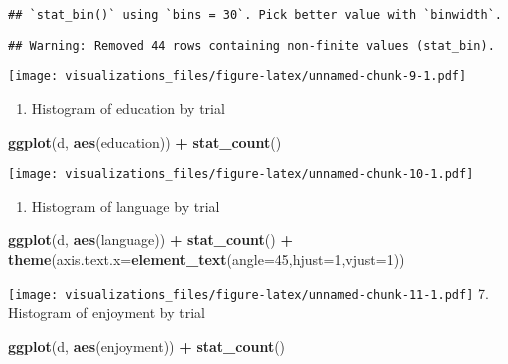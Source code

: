 \documentclass[]{article}
\newenvironment{Shaded}{\begin{snugshade}}{\end{snugshade}}
\newcommand{\KeywordTok}[1]{\textcolor[rgb]{0.13,0.29,0.53}{\textbf{#1}}}
\newcommand{\DataTypeTok}[1]{\textcolor[rgb]{0.13,0.29,0.53}{#1}}
\newcommand{\DecValTok}[1]{\textcolor[rgb]{0.00,0.00,0.81}{#1}}
\newcommand{\StringTok}[1]{\textcolor[rgb]{0.31,0.60,0.02}{#1}}
\newcommand{\OperatorTok}[1]{\textcolor[rgb]{0.81,0.36,0.00}{\textbf{#1}}}
\newcommand{\NormalTok}[1]{#1}
\providecommand{\tightlist}{%
  \setlength{\itemsep}{0pt}\setlength{\parskip}{0pt}}
\begin{document}
\begin{verbatim}
## `stat_bin()` using `bins = 30`. Pick better value with `binwidth`.
\end{verbatim}

\begin{verbatim}
## Warning: Removed 44 rows containing non-finite values (stat_bin).
\end{verbatim}

\texttt{[image: visualizations\_files/figure-latex/unnamed-chunk-9-1.pdf]}

\begin{enumerate}
\def\labelenumi{\arabic{enumi}.}
\setcounter{enumi}{4}
\tightlist
\item
  Histogram of education by trial
\end{enumerate}

\begin{Shaded}
\begin{Highlighting}[]
\KeywordTok{ggplot}\NormalTok{(d, }\KeywordTok{aes}\NormalTok{(education)) }\OperatorTok{+}
\StringTok{   }\KeywordTok{stat_count}\NormalTok{()}
\end{Highlighting}
\end{Shaded}

\texttt{[image: visualizations\_files/figure-latex/unnamed-chunk-10-1.pdf]}

\begin{enumerate}
\def\labelenumi{\arabic{enumi}.}
\setcounter{enumi}{5}
\tightlist
\item
  Histogram of language by trial
\end{enumerate}

\begin{Shaded}
\begin{Highlighting}[]
\KeywordTok{ggplot}\NormalTok{(d, }\KeywordTok{aes}\NormalTok{(language)) }\OperatorTok{+}
\StringTok{   }\KeywordTok{stat_count}\NormalTok{() }\OperatorTok{+}
\StringTok{   }\KeywordTok{theme}\NormalTok{(}\DataTypeTok{axis.text.x=}\KeywordTok{element_text}\NormalTok{(}\DataTypeTok{angle=}\DecValTok{45}\NormalTok{,}\DataTypeTok{hjust=}\DecValTok{1}\NormalTok{,}\DataTypeTok{vjust=}\DecValTok{1}\NormalTok{))}
\end{Highlighting}
\end{Shaded}

\texttt{[image: visualizations\_files/figure-latex/unnamed-chunk-11-1.pdf]}
7. Histogram of enjoyment by trial

\begin{Shaded}
\begin{Highlighting}[]
\KeywordTok{ggplot}\NormalTok{(d, }\KeywordTok{aes}\NormalTok{(enjoyment)) }\OperatorTok{+}
\StringTok{  }\KeywordTok{stat_count}\NormalTok{()}
\end{Highlighting}
\end{Shaded}
\end{document}
